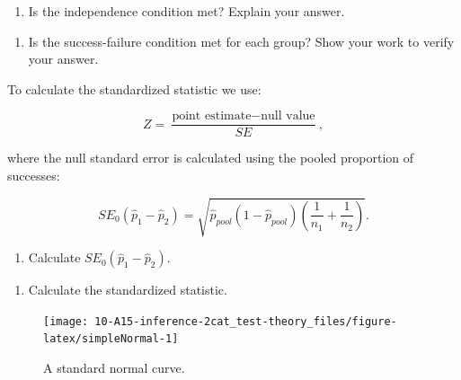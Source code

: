 \documentclass[
]{report}
\providecommand{\tightlist}{%
  \setlength{\itemsep}{0pt}\setlength{\parskip}{0pt}}
\begin{document}
\vspace{.1in}

\begin{enumerate}
\def\labelenumi{\arabic{enumi}.}
\setcounter{enumi}{5}
\tightlist
\item
  Is the independence condition met? Explain your answer.
\end{enumerate}

\vspace{0.4in}

\begin{enumerate}
\def\labelenumi{\arabic{enumi}.}
\setcounter{enumi}{6}
\tightlist
\item
  Is the success-failure condition met for each group? Show your work to verify your answer.
\end{enumerate}

\vspace{0.8in}

To calculate the standardized statistic we use:

\[
Z = \frac{\text{point estimate} - \text{null value}}{SE},
\]

where the null standard error is calculated using the pooled proportion of successes:

\[
SE_0(\hat{p}_1-\hat{p}_2)=\sqrt{\hat{p}_{pool}(1-\hat{p}_{pool})\left(\frac{1}{n_1}+\frac{1}{n_2}\right)}.
\]

\begin{enumerate}
\def\labelenumi{\arabic{enumi}.}
\setcounter{enumi}{7}
\tightlist
\item
  Calculate \(SE_0(\hat{p}_1-\hat{p}_2)\).
\end{enumerate}

\vspace{1in}

\begin{enumerate}
\def\labelenumi{\arabic{enumi}.}
\setcounter{enumi}{8}
\tightlist
\item
  Calculate the standardized statistic.
\end{enumerate}

\vspace{1in}

\newpage

\begin{figure}

{\centering \texttt{[image: 10-A15-inference-2cat\_test-theory\_files/figure-latex/simpleNormal-1]} 

}

\caption{A standard normal curve.}\label{fig:simpleNormal}
\end{figure}
\end{document}
